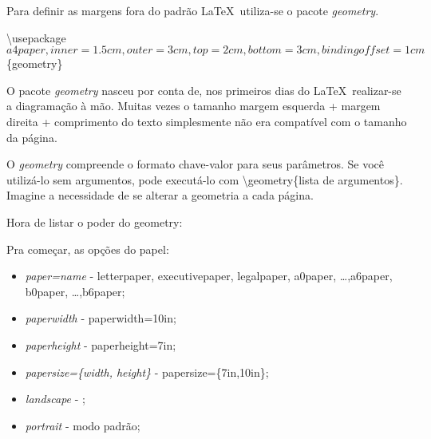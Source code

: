 \documentclass{a4paper, 12pts}{book}
\begin{document}
Para definir as margens fora do padrão \LaTeX\ utiliza-se o pacote \emph{geometry}.

\backslash usepackage\[a4paper, inner=1.5cm, outer=3cm, top=2cm, bottom=3cm, bindingoffset=1cm\]\{geometry\}

O pacote \emph{geometry} nasceu por conta de, nos primeiros dias do \LaTeX\, realizar-se a diagramação à mão.
Muitas vezes o tamanho margem esquerda + margem direita + comprimento do texto 
simplesmente não era compatível com o tamanho da página.

O \emph{geometry} compreende o formato chave-valor para seus parâmetros.
Se você utilizá-lo sem argumentos, pode executá-lo com \backslash geometry\{lista de argumentos\}.
Imagine a necessidade de se alterar a geometria a cada página.

Hora de listar o poder do geometry:

Pra começar, as opções do papel:
\begin{itemize}
    \item \emph{paper=name} - letterpaper, executivepaper, legalpaper, a0paper, \ldots ,a6paper, b0paper, \ldots ,b6paper;
    \item \emph{paperwidth} - paperwidth=10in;
    \item \emph{paperheight} - paperheight=7in;
    \item \emph{papersize=\{width, height\}} - papersize=\{7in,10in\};
    \item \emph{landscape} - ;
    \item \emph{portrait} - modo padrão;
\end{itemize}
\end{document}
